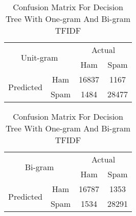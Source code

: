 \begin{table}[H]
\centering
\begin{subtable}{.5\textwidth}
\centering
\begin{tabular}{@{}|c|c|c|c|@{}}
\toprule
\multicolumn{2}{|c|}{\multirow{2}{*}{Unit-gram}} & \multicolumn{2}{c|}{Actual} \\ \cmidrule(l){3-4} 
\multicolumn{2}{|c|}{}                        & Ham          & Spam         \\ \midrule
\multirow{2}{*}{Predicted}       & Ham        & 16837        & 1167         \\ \cmidrule(l){2-4} 
                                 & Spam       & 1484         & 28477        \\ \bottomrule
\end{tabular}

\begin{tabular}{@{}|c|c|c|c|@{}}
\toprule
\multicolumn{2}{|c|}{\multirow{2}{*}{Bi-gram}} & \multicolumn{2}{c|}{Actual} \\ \cmidrule(l){3-4} 
\multicolumn{2}{|c|}{}                        & Ham          & Spam         \\ \midrule
\multirow{2}{*}{Predicted}       & Ham        & 16787        & 1353         \\ \cmidrule(l){2-4} 
                                 & Spam       & 1534         & 28291        \\ \bottomrule
\end{tabular}
\end{subtable}
\caption{Confusion Matrix For Decision Tree With One-gram And Bi-gram TFIDF}
\label{Confusion_DT}
\end{table}
